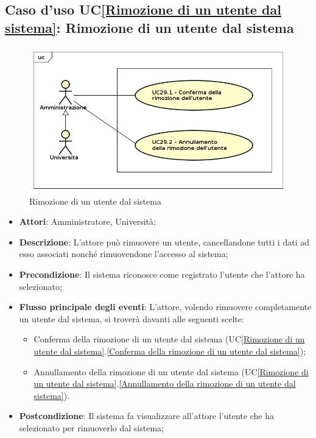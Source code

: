 \subsection{Caso d'uso UC\ref{Rimozione di un utente dal sistema}: Rimozione di un utente dal sistema}
\begin{figure} [H]
	\centering
	\includegraphics[scale=0.45]{./img/UseCaseDiagram029.png}
	\caption{Rimozione di un utente dal sistema}\label{}
\end{figure}
\begin{itemize}
	\item \textbf{Attori}: Amministratore, Università;
	\item \textbf{Descrizione}: L'attore può rimuovere un utente, cancellandone tutti i dati ad esso associati nonché rimuovendone l'accesso al sistema;
	\item \textbf{Precondizione}: Il sistema riconosce come registrato l'utente che l'attore ha selezionato;
	\item \textbf{Flusso principale degli eventi}: L'attore, volendo rimuovere completamente un utente dal sistema, si troverà davanti alle seguenti scelte:
	\begin{itemize}
		\item Conferma della rimozione di un utente dal sistema (UC\ref{Rimozione di un utente dal sistema}.\ref{Conferma della rimozione di un utente dal sistema});
		\item Annullamento della rimozione di un utente dal sistema (UC\ref{Rimozione di un utente dal sistema}.\ref{Annullamento della rimozione di un utente dal sistema}).
	\end{itemize}
	\item \textbf{Postcondizione}: Il sistema fa visualizzare all'attore l'utente che ha selezionato per rimuoverlo dal sistema;
\end{itemize}

